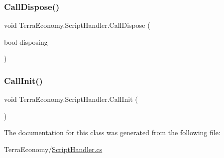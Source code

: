 \subsubsection{\texorpdfstring{Call\+Dispose()}{CallDispose()}}
{\footnotesize\ttfamily void Terra\+Economy.\+Script\+Handler.\+Call\+Dispose (\begin{DoxyParamCaption}\item[{bool}]{disposing }\end{DoxyParamCaption})\hspace{0.3cm}{\ttfamily [inline]}}

\mbox{\label{class_terra_economy_1_1_script_handler_aa580a9c066166786d20b502609cffc8c}} 
\subsubsection{\texorpdfstring{Call\+Init()}{CallInit()}}
{\footnotesize\ttfamily void Terra\+Economy.\+Script\+Handler.\+Call\+Init (\begin{DoxyParamCaption}{ }\end{DoxyParamCaption})\hspace{0.3cm}{\ttfamily [inline]}}



The documentation for this class was generated from the following file\+:\begin{DoxyCompactItemize}
\item 
Terra\+Economy/\hyperlink{_script_handler_8cs}{Script\+Handler.\+cs}\end{DoxyCompactItemize}
